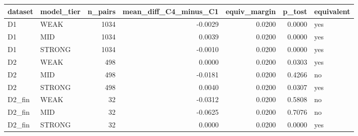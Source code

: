 \begin{tabular}{llrrrrl}
\toprule
dataset & model\_tier & n\_pairs & mean\_diff\_C4\_minus\_C1 & equiv\_margin & p\_tost & equivalent \\
\midrule
D1 & WEAK & 1034 & -0.0029 & 0.0200 & 0.0000 & yes \\
D1 & MID & 1034 & 0.0039 & 0.0200 & 0.0000 & yes \\
D1 & STRONG & 1034 & -0.0010 & 0.0200 & 0.0000 & yes \\
D2 & WEAK & 498 & 0.0000 & 0.0200 & 0.0303 & yes \\
D2 & MID & 498 & -0.0181 & 0.0200 & 0.4266 & no \\
D2 & STRONG & 498 & 0.0040 & 0.0200 & 0.0307 & yes \\
D2\_fin & WEAK & 32 & -0.0312 & 0.0200 & 0.5808 & no \\
D2\_fin & MID & 32 & -0.0625 & 0.0200 & 0.7076 & no \\
D2\_fin & STRONG & 32 & 0.0000 & 0.0200 & 0.0000 & yes \\
\bottomrule
\end{tabular}
